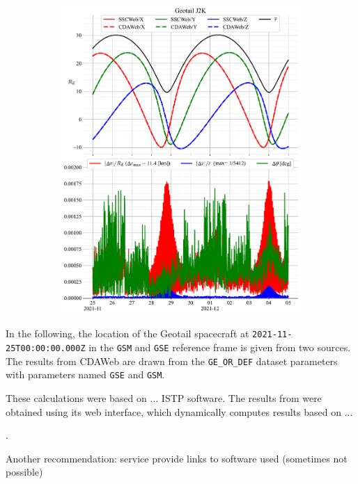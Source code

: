 \documentclass[draft]{agujournal2019}
\begin{document}
\begin{figure}[h]
\begin{subfigure}[b]{0.49\textwidth}
         \includegraphics[width=\textwidth]{figures/Geotail_J2K_SSCWeb_vs_CDAWeb.pdf}
     \end{subfigure}
     \caption{}
     \label{fig:geotail}
\end{figure}

\clearpage

In the following, the location of the Geotail spacecraft at \texttt{2021-11-25T00:00:00.000Z} in the \texttt{GSM} and \texttt{GSE} reference frame is given from two sources. The results from CDAWeb are drawn from the \texttt{GE\_OR\_DEF} dataset parameters with parameters named \texttt{GSE} and \texttt{GSM}.

These calculations were based on ... ISTP software. The results from  were obtained using its web interface, which dynamically computes results based on ...

.

Another recommendation: service provide links to software used (sometimes not possible)
\end{document}
